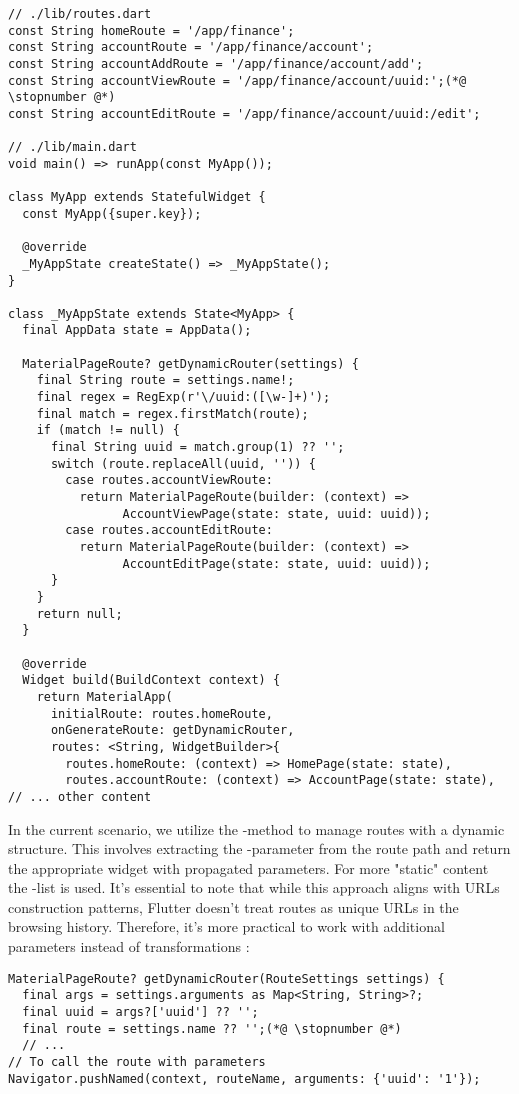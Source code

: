 \begin{lstlisting}
// ./lib/routes.dart
const String homeRoute = '/app/finance';
const String accountRoute = '/app/finance/account';
const String accountAddRoute = '/app/finance/account/add';
const String accountViewRoute = '/app/finance/account/uuid:';(*@ \stopnumber @*)
const String accountEditRoute = '/app/finance/account/uuid:/edit';

// ./lib/main.dart
void main() => runApp(const MyApp());

class MyApp extends StatefulWidget {
  const MyApp({super.key});

  @override
  _MyAppState createState() => _MyAppState();
}

class _MyAppState extends State<MyApp> {
  final AppData state = AppData();

  MaterialPageRoute? getDynamicRouter(settings) {
    final String route = settings.name!;
    final regex = RegExp(r'\/uuid:([\w-]+)');
    final match = regex.firstMatch(route);
    if (match != null) {
      final String uuid = match.group(1) ?? '';
      switch (route.replaceAll(uuid, '')) {
        case routes.accountViewRoute:
          return MaterialPageRoute(builder: (context) => 
                AccountViewPage(state: state, uuid: uuid));
        case routes.accountEditRoute:
          return MaterialPageRoute(builder: (context) => 
                AccountEditPage(state: state, uuid: uuid));
      }
    }
    return null;
  }

  @override
  Widget build(BuildContext context) {
    return MaterialApp(
      initialRoute: routes.homeRoute,
      onGenerateRoute: getDynamicRouter,
      routes: <String, WidgetBuilder>{
        routes.homeRoute: (context) => HomePage(state: state),
        routes.accountRoute: (context) => AccountPage(state: state),
// ... other content
\end{lstlisting}

\noindent In the current scenario, we utilize the -method to manage routes with a dynamic structure. 
This involves extracting the -parameter from the route path and return the appropriate widget with propagated 
parameters. For more "static" content the -list is used. It's essential to note that while this approach 
aligns with URLs construction patterns, Flutter doesn't treat routes as unique URLs in the browsing history. Therefore, 
it's more practical to work with additional parameters instead of  transformations :

\begin{lstlisting}
MaterialPageRoute? getDynamicRouter(RouteSettings settings) {
  final args = settings.arguments as Map<String, String>?;
  final uuid = args?['uuid'] ?? '';
  final route = settings.name ?? '';(*@ \stopnumber @*)
  // ...
// To call the route with parameters
Navigator.pushNamed(context, routeName, arguments: {'uuid': '1'});
\end{lstlisting}

